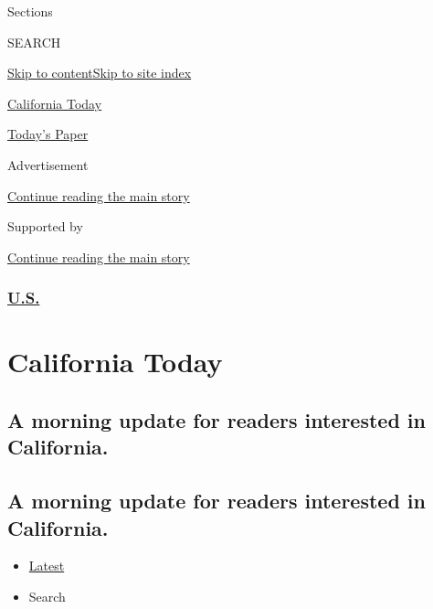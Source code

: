Sections

SEARCH

\protect\hyperlink{site-content}{Skip to
content}\protect\hyperlink{site-index}{Skip to site index}

\href{https://www.nytimes3xbfgragh.onion/column/california-today}{California
Today}

\href{https://myaccount.nytimes3xbfgragh.onion/auth/login?response_type=cookie\&client_id=vi}{}

\href{https://www.nytimes3xbfgragh.onion/section/todayspaper}{Today's
Paper}

Advertisement

\protect\hyperlink{after-top}{Continue reading the main story}

Supported by

\protect\hyperlink{after-sponsor}{Continue reading the main story}

\hypertarget{us}{%
\subsubsection{\texorpdfstring{\href{/section/us}{U.S.}}{U.S.}}\label{us}}

\hypertarget{california-today}{%
\section{California Today}\label{california-today}}

\hypertarget{a-morning-update-for-readers-interested-in-california}{%
\subsection{A morning update for readers interested in
California.}\label{a-morning-update-for-readers-interested-in-california}}

\hypertarget{a-morning-update-for-readers-interested-in-california-1}{%
\subsection{A morning update for readers interested in
California.}\label{a-morning-update-for-readers-interested-in-california-1}}

\begin{itemize}
\tightlist
\item
  \protect\hyperlink{stream-panel}{Latest}
\item
  Search
\end{itemize}

